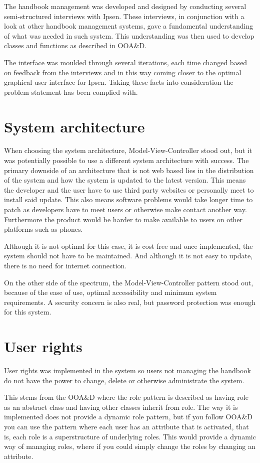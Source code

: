 The handbook management was developed and designed by conducting several semi-structured interviews with Ipsen. These interviews, in conjunction with a look at other handbook management systems, gave a fundamental understanding of what was needed in such system. This understanding was then used to develop classes and functions as described in OOA\&D\cite{Rod-Aalborg}.

The interface was moulded through several iterations, each time changed based on feedback from the interviews and in this way coming closer to the optimal graphical user interface for Ipsen. Taking these facts into consideration the problem statement has been complied with.

\section{System architecture}
When choosing the system architecture, Model-View-Controller stood out, but it was potentially possible to use a different system architecture with success. The primary downside of an architecture that is not web based lies in the distribution of the system and how the system is updated to the latest version. This means the developer and the user have to use third party websites or personally meet to install said update. This also means software problems would take longer time to patch as developers have to meet users or otherwise make contact another way. Furthermore the product would be harder to make available to users on other platforms such as phones.

Although it is not optimal for this case, it is cost free and once implemented, the system should not have to be maintained. And although it is not easy to update, there is no need for internet connection.

On the other side of the spectrum, the Model-View-Controller pattern stood out, because of the ease of use, optimal accessibility and minimum system requirements. A security concern is also real, but password protection was enough for this system.

\section{User rights}

User rights was implemented in the system so users not managing the handbook do not have the power to change, delete or otherwise administrate the system.

This stems from the OOA\&D where the role pattern is described as having role as an abstract class and having other classes inherit from role. The way it is implemented does not provide a dynamic role pattern, but if you follow OOA\&D you can use the pattern where each user has an attribute that is activated, that is, each role is a superstructure of underlying roles. This would provide a dynamic way of managing roles, where if you could simply change the roles by changing an attribute.

